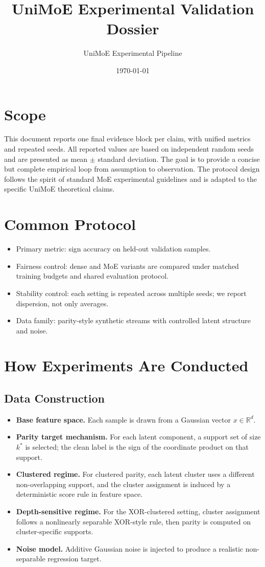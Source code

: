 \documentclass[11pt]{article}
\title{UniMoE Experimental Validation Dossier}
\author{UniMoE Experimental Pipeline}
\date{\today}
\begin{document}
\maketitle

\section{Scope}
This document reports one final evidence block per claim, with unified metrics and repeated seeds.
All reported values are based on independent random seeds and are presented as mean $\pm$ standard deviation.
The goal is to provide a concise but complete empirical loop from assumption to observation.
The protocol design follows the spirit of standard MoE experimental guidelines and is adapted to the specific UniMoE theoretical claims.

\section{Common Protocol}
\begin{itemize}
    \item Primary metric: sign accuracy on held-out validation samples.
    \item Fairness control: dense and MoE variants are compared under matched training budgets and shared evaluation protocol.
    \item Stability control: each setting is repeated across multiple seeds; we report dispersion, not only averages.
    \item Data family: parity-style synthetic streams with controlled latent structure and noise.
\end{itemize}

\section{How Experiments Are Conducted}
\subsection{Data Construction}
\begin{itemize}
    \item \textbf{Base feature space.} Each sample is drawn from a Gaussian vector $x \in \mathbb{R}^d$.
    \item \textbf{Parity target mechanism.} For each latent component, a support set of size $k^*$ is selected; the clean label is the sign of the coordinate product on that support.
    \item \textbf{Clustered regime.} For clustered parity, each latent cluster uses a different non-overlapping support, and the cluster assignment is induced by a deterministic score rule in feature space.
    \item \textbf{Depth-sensitive regime.} For the XOR-clustered setting, cluster assignment follows a nonlinearly separable XOR-style rule, then parity is computed on cluster-specific supports.
    \item \textbf{Noise model.} Additive Gaussian noise is injected to produce a realistic non-separable regression target.
\end{itemize}
\end{document}
